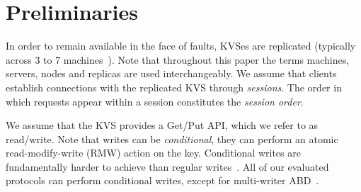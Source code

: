 \section{Preliminaries}
\label{sec:prel}

\begin{comment}
papers to comment on
\squishlist
\item raft,  Viewstamped Replication, ZAB, nsdi fine-grained
\item mencius, derecho (vritual sychrony?)
\item allconcur
\item epaxos, generalized paxos, CASPaxos
\item quorum leases
\item cr-craq-primary backup-hermes
\item abd- dynastore (ABD+ reconfigurations)
\item Sift: Resource-Efficient Consensus with RDMA
\item fast reads with leases
\item Vive La Difference: Paxos vs. Viewstamped Replication vs. Zab
\item Dare, Sift, Apus, NoPaxos, Netchain
\squishend
\end{comment}

 
In order to remain available in the face of faults, KVSes are replicated (typically across 3 to 7 machines~\cite{Hunt:2010}). Note that throughout this paper
the terms machines, servers, nodes and replicas are used interchangeably.
We assume that clients establish connections with the replicated KVS through \emph{sessions}. 
The order in which requests appear within a session constitutes the \emph{session order}.

We assume that the KVS provides a Get/Put API, which we refer to as read/write.
Note that writes can be \emph{conditional}, \ie they can perform an atomic read-modify-write (RMW) action on the key. Conditional writes are fundamentally harder to achieve than regular writes~\cite{Herlihy:2008}.
All of our evaluated protocols can perform conditional writes, except for multi-writer ABD~\cite{Lynch:1997}. 

